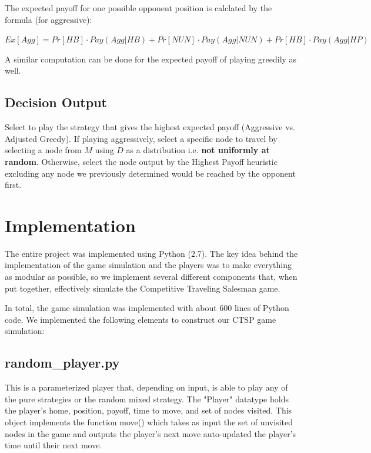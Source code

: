 \documentclass[pageno]{jpaper}
\begin{document}
The expected payoff for one possible opponent position is calclated by the formula (for aggressive):

\begin{center}
	$Ex[Agg] = Pr[HB] \cdot Pay(Agg| HB) + Pr[NUN] \cdot Pay(Agg | NUN) + Pr[HB] \cdot Pay(Agg | HP)$
\end{center}

A similar computation can be done for the expected payoff of playing greedily as well.

\subsection{Decision Output}

Select to play the strategy that gives the highest expected payoff (Aggressive vs. Adjusted Greedy). If playing aggressively, select a specific node to travel by selecting a node from $M$ using $D$ as a distribution i.e. \textbf{not uniformly at random}. Otherwise, select the node output by the Highest Payoff heuristic excluding any node we previously determined would be reached by the opponent first.\newline

\section{Implementation}

The entire project was implemented using Python (2.7). The key idea behind the implementation of the game simulation and the players was to make everything as modular as possible, so we implement several different components that, when put together, effectively simulate the Competitive Traveling Salesman game.\par 
In total, the game simulation was implemented with about 600 lines of Python code. We implemented the following elements to construct our CTSP game simulation:

\subsection{random\_player.py}
This is a parameterized player that, depending on input, is able to play any of the pure strategies or the random mixed strategy. The "Player" datatype holds the player's home, position, payoff, time to move, and set of nodes visited. This object implements the function move() which takes as input the set of unvisited nodes in the game and outputs the player's next move auto-updated the player's time until their next move.
\end{document}
